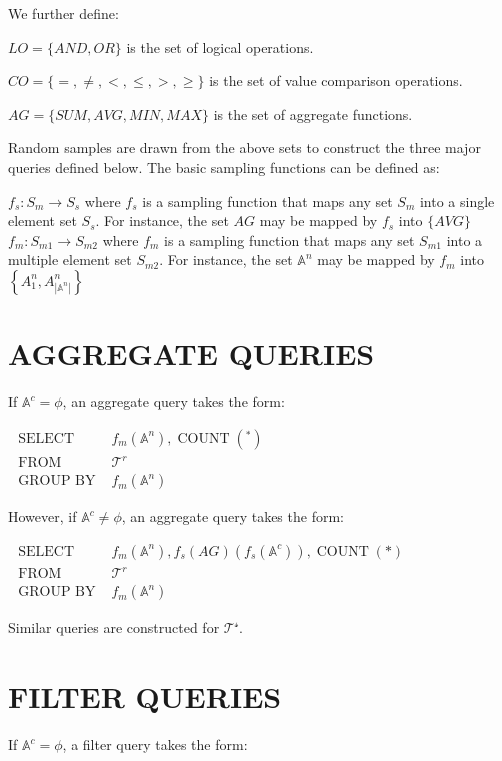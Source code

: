 \documentclass[10pt]{article}
\begin{document}
We further define:

$L O=\{A N D, O R\}$ is the set of logical operations.

$C O=\{=, \neq,<, \leq,>, \geq\}$ is the set of value comparison operations.

$A G=\{S U M, A V G, M I N, M A X\}$ is the set of aggregate functions.

Random samples are drawn from the above sets to construct the three major queries defined below. The basic sampling functions can be defined as:

$f_{s}: S_{m} \rightarrow S_{s}$ where $f_{s}$ is a sampling function that maps any set $S_{m}$ into a single element set $S_{s}$. For instance, the set $A G$ may be mapped by $f_{s}$ into $\{A V G\}$ $f_{m}: S_{m 1} \rightarrow S_{m 2}$ where $f_{m}$ is a sampling function that maps any set $S_{m 1}$ into a multiple element set $S_{m 2}$. For instance, the set $\mathbb{A}^{n}$ may be mapped by $f_{m}$ into $\left\{A_{1}^{n}, A_{\left|\mathbb{A}^{n}\right|}^{n}\right\}$

\section{AGGREGATE QUERIES}
If $\mathbb{A}^{c}=\phi$, an aggregate query takes the form:

$\begin{array}{ll}\text { SELECT } & f_{m}\left(\mathbb{A}^{n}\right), \operatorname{COUNT}\left(^{*}\right) \\ \text { FROM } & \mathcal{T}^{r} \\ \text { GROUP BY } & f_{m}\left(\mathbb{A}^{n}\right)\end{array}$

However, if $\mathbb{A}^{c} \neq \phi$, an aggregate query takes the form:

$\begin{array}{ll}\text { SELECT } & f_{m}\left(\mathbb{A}^{n}\right), f_{s}(A G)\left(f_{s}\left(\mathbb{A}^{c}\right)\right), \operatorname{COUNT}(*) \\ \text { FROM } & \mathcal{T}^{r} \\ \text { GROUP BY } & f_{m}\left(\mathbb{A}^{n}\right)\end{array}$

Similar queries are constructed for $\mathcal{T}^{\mathcal{s}}$.

\section{FILTER QUERIES}
If $\mathbb{A}^{c}=\phi$, a filter query takes the form:
\end{document}
